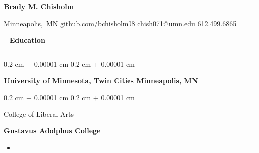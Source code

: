 \documentclass[12pt]{article} %
\newenvironment{highlights}{
    \begin{itemize}[
        topsep=0.10 cm,
        parsep=0.10 cm,
        partopsep=0pt,
        itemsep=0pt,
        leftmargin=0.4 cm + 10pt
    ]
}
{
    \end{itemize}
} %
\newenvironment{onecolentry}{
    \begin{adjustwidth}{
        0.2 cm + 0.00001 cm
    }{
        0.2 cm + 0.00001 cm
    }
}{
    \end{adjustwidth}
} %
\newenvironment{header}{
    \setlength{\topsep}{0pt}\par\kern\topsep\centering\color{primaryColor}\linespread{1.5}
}{
    \par\kern\topsep\
} %
\begin{document}
 

    \begin{header}


    \fontsize{30pt}{30pt}\selectfont\textbf{Brady M. Chisholm}

    \vspace{0.3cm}

    \normalsize
    \mbox{{\footnotesize\faMapMarker*}\hspace*{0.13cm}Minneapolis, MN}%
    \kern 0.4cm %
    \mbox{\href{https://github.com/bchisholm08}{{\footnotesize\faGithub}\hspace*{0.13cm}github.com/bchisholm08}}%
    \kern 0.4cm %
    \mbox{\href{mailto:chish071@umn.edu}{{\footnotesize\faEnvelope[regular]}\hspace*{0.13cm}chish071@umn.edu}}%
    \kern 0.4cm %
    \mbox{\href{tel:6124996865}{{\footnotesize\faPhone*}\hspace*{0.13cm}612.499.6865}}
    \end{header}
{\fontsize{13}{12}\selectfont \textbf{Education}\\} %

\vspace{-.3in}

\rule{\textwidth}{0.05pt} %

  \begin{onecolentry}
  {\fontsize{12}{1}\selectfont\textbf{University of Minnesota, Twin Cities Minneapolis, MN}\\} %
  \vspace{-.25in} %
        \begin{onecolentry}
            College of Liberal Arts
        \end{onecolentry}
  {\fontsize{12}{1}\selectfont \textbf{Gustavus Adolphus College}\\} %
    \vspace{-.25in}
          \begin{highlights}
            \item <	>
        \end{highlights}
    \end{onecolentry}
    
\end{document}
